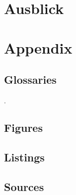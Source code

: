 \documentclass[12pt]{article}
\begin{document}
\newpage %
\section{Ausblick}
%

\newpage %
\cfoot{}
\section{Appendix}
\label{sec:appenix}

\subsection{Glossaries}
\label{subsec:glossaries}
\begingroup
\renewcommand{\section}[2]{}
\printglossary[style=tree]
\endgroup
\newpage

{\small\color{white}.}
\vspace{-2cm}
\subsection{Figures}
\label{subsec:figures}
\begingroup
\renewcommand{\section}[2]{}
\listoffigures
\endgroup

\subsection{Listings}
\label{subsec:listings}
\begingroup
\renewcommand{\section}[2]{}
\lstlistoflistings
\endgroup

\subsection{Sources}
\label{subsec:sources}
\begingroup
\renewcommand{\section}[2]{}


\endgroup
\end{document}

